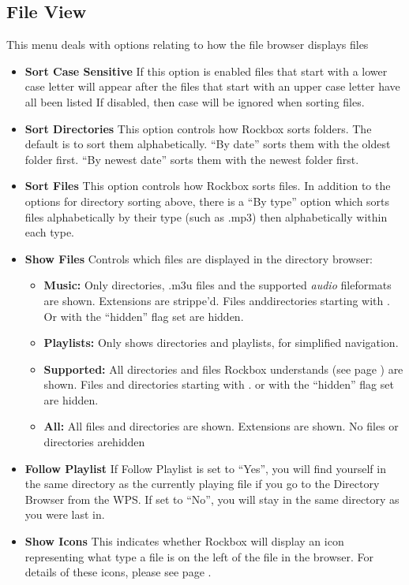 	\subsection{File View}
  This menu deals with options relating to how the file browser displays files
  
  \begin{itemize}
  \item \textbf{Sort Case Sensitive}
    If this option is enabled files that start with a lower case letter will appear after the files that start with an upper case letter have all been listed  If disabled, then case will be ignored when sorting files.
  \item \textbf{Sort Directories}
    This option controls how Rockbox sorts folders.  The default is to sort them alphabetically.  ``By date'' sorts them with the oldest folder first.  ``By newest date'' sorts them with the newest folder first.
    
  \item \textbf{Sort Files}
    This option controls how Rockbox sorts files.  In addition to the options for directory sorting above, there is a ``By type'' option which sorts files alphabetically by their type (such as .mp3) then alphabetically within each type.
    
  \item \textbf{\label{ref:ShowFiles}Show Files}
    Controls which files are displayed in the directory browser:
    
    \begin{itemize}
    \item \textbf{Music: }
      Only directories, .m3u files and the supported \emph{audio} fileformats are shown. Extensions are strippe'd. Files anddirectories starting with . Or with the ``hidden'' flag set are hidden.
    \item \textbf{Playlists:} 
      Only shows directories and playlists, for simplified navigation.
    \item \textbf{Supported:} 
      All directories and files Rockbox understands (see page \pageref{ref:Supportedfileformats}) are shown. Files and directories starting with . or with the ``hidden'' flag set are hidden.
    \item \textbf{All:}
      All files and directories are shown. Extensions are shown. No files or directories arehidden
    \end{itemize}
    
  \item \textbf{Follow Playlist}
    If Follow Playlist is set to ``Yes'', you will find yourself in the same directory as the currently playing file if you go to the Directory Browser from the WPS. If set to ``No'', you will stay in the same directory as you were last in.
    
  \item \textbf{Show Icons}
    This indicates whether Rockbox will display an icon representing what type a file is on the left of the file in the browser.  For details of these icons, please see page \pageref{ref:Supportedfileformats}.
  \end{itemize}
 